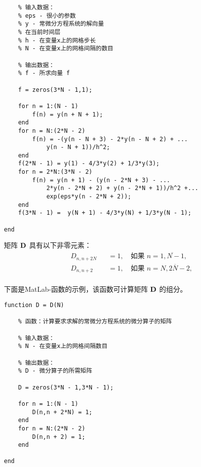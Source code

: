 \documentclass[twoside]{book}
\def\textbf{\bf}%
\begin{document}
\begin{CJK*}{GBK}{song}
\begin{lstlisting}
    % 输入数据：
    % eps - 很小的参数
    % y - 常微分方程系统的解向量
    % 在当前时间层
    % h - 在变量x上的网格步长
    % N - 在变量x上的网格间隔的数目

    % 输出数据：
    % f - 所求向量 f

    f = zeros(3*N - 1,1);

    for n = 1:(N - 1)
        f(n) = y(n + N + 1);
    end
    for n = N:(2*N - 2)
        f(n) = -(y(n - N + 3) - 2*y(n - N + 2) + ...
            y(n - N + 1))/h^2;
    end
    f(2*N - 1) = y(1) - 4/3*y(2) + 1/3*y(3);
    for n = 2*N:(3*N - 2)
        f(n) = y(n + 1) - (y(n - 2*N + 3) - ...
            2*y(n - 2*N + 2) + y(n - 2*N + 1))/h^2 +...
            exp(eps*y(n - 2*N + 2));
    end
    f(3*N - 1) =  y(N + 1) - 4/3*y(N) + 1/3*y(N - 1);

end
\end{lstlisting}

矩阵 $\emph{\textbf{D}}$ 具有以下非零元素：
\begin{equation*}
    \begin{aligned}
        &D_{n,n + 2N} & &= 1, \quad \text{如果 $n = \overline{1,N-1}$,}\\
        &D_{n,n + 2} & &= 1, \quad \text{如果 $n = \overline{N,2N-2}$,}\\
    \end{aligned}
\end{equation*}

下面是MatLab-函数的示例，该函数可计算矩阵 $\emph{\textbf{D}}$ 的组分。%
%
\begin{lstlisting}
function D = D(N)

    % 函数：计算要求求解的常微分方程系统的微分算子的矩阵

    % 输入数据：
    % N - 在变量x上的网格间隔数目

    % 输出数据：
    % D - 微分算子的所需矩阵

    D = zeros(3*N - 1,3*N - 1);

    for n = 1:(N - 1)
        D(n,n + 2*N) = 1;
    end
    for n = N:(2*N - 2)
        D(n,n + 2) = 1;
    end

end
\end{lstlisting}


\end{CJK*}
\end{document}

